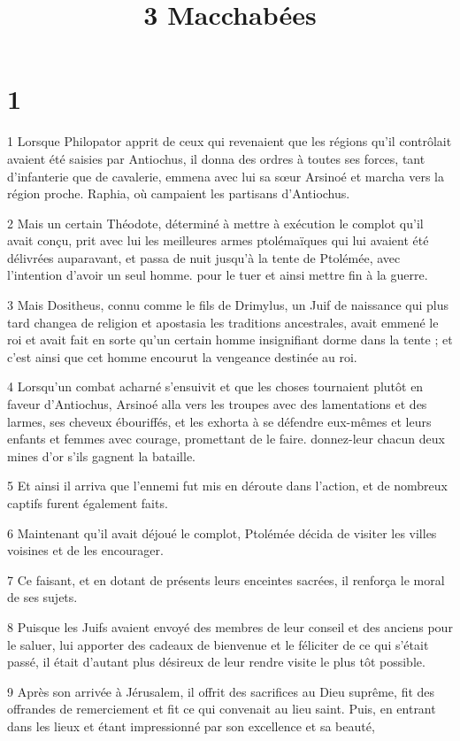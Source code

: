 

\title{3 Macchabées}


\chapter{1}

\par 1 Lorsque Philopator apprit de ceux qui revenaient que les régions qu'il contrôlait avaient été saisies par Antiochus, il donna des ordres à toutes ses forces, tant d'infanterie que de cavalerie, emmena avec lui sa sœur Arsinoé et marcha vers la région proche. Raphia, où campaient les partisans d'Antiochus.
\par 2 Mais un certain Théodote, déterminé à mettre à exécution le complot qu'il avait conçu, prit avec lui les meilleures armes ptolémaïques qui lui avaient été délivrées auparavant, et passa de nuit jusqu'à la tente de Ptolémée, avec l'intention d'avoir un seul homme. pour le tuer et ainsi mettre fin à la guerre.
\par 3 Mais Dositheus, connu comme le fils de Drimylus, un Juif de naissance qui plus tard changea de religion et apostasia les traditions ancestrales, avait emmené le roi et avait fait en sorte qu'un certain homme insignifiant dorme dans la tente ; et c'est ainsi que cet homme encourut la vengeance destinée au roi.
\par 4 Lorsqu'un combat acharné s'ensuivit et que les choses tournaient plutôt en faveur d'Antiochus, Arsinoé alla vers les troupes avec des lamentations et des larmes, ses cheveux ébouriffés, et les exhorta à se défendre eux-mêmes et leurs enfants et femmes avec courage, promettant de le faire. donnez-leur chacun deux mines d'or s'ils gagnent la bataille.
\par 5 Et ainsi il arriva que l'ennemi fut mis en déroute dans l'action, et de nombreux captifs furent également faits.
\par 6 Maintenant qu'il avait déjoué le complot, Ptolémée décida de visiter les villes voisines et de les encourager.
\par 7 Ce faisant, et en dotant de présents leurs enceintes sacrées, il renforça le moral de ses sujets.
\par 8 Puisque les Juifs avaient envoyé des membres de leur conseil et des anciens pour le saluer, lui apporter des cadeaux de bienvenue et le féliciter de ce qui s'était passé, il était d'autant plus désireux de leur rendre visite le plus tôt possible.
\par 9 Après son arrivée à Jérusalem, il offrit des sacrifices au Dieu suprême, fit des offrandes de remerciement et fit ce qui convenait au lieu saint. Puis, en entrant dans les lieux et étant impressionné par son excellence et sa beauté,
